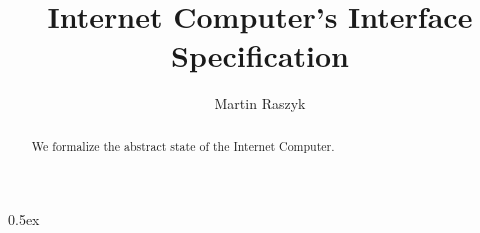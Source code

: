 \documentclass[10pt,a4paper]{article}
\begin{document}
\title{Internet Computer's Interface Specification}
\author{Martin Raszyk}

\maketitle

\begin{abstract}
We formalize the abstract state of the Internet Computer.
\end{abstract}

\tableofcontents

\parindent 0pt\parskip 0.5ex



%
%
\end{document}
